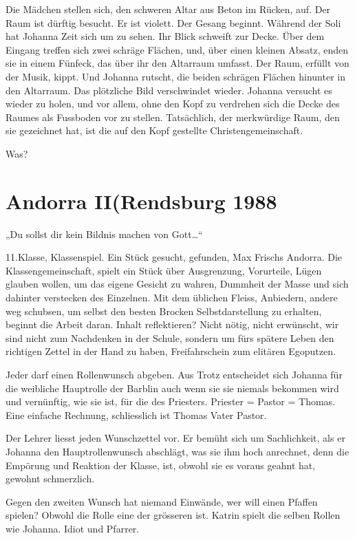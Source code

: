 \documentclass[10pt,a5paper]{book}
\begin{document}
Die Mädchen stellen sich, den schweren Altar aus Beton im Rücken, auf. Der Raum ist dürftig besucht. Er ist violett. Der Gesang beginnt. Während der Soli hat Johanna Zeit sich um zu sehen. Ihr Blick schweift zur Decke. Über dem Eingang treffen sich zwei schräge Flächen, und, über einen kleinen Absatz, enden sie in einem Fünfeck, das über ihr den Altarraum umfasst.
Der Raum, erfüllt von der Musik, kippt. Und Johanna rutscht, die beiden schrägen Flächen hinunter  in den Altarraum. Das plötzliche Bild verschwindet wieder. Johanna versucht es wieder zu holen, und vor allem, ohne den Kopf zu verdrehen sich die Decke des Raumes als Fussboden vor zu stellen. Tatsächlich, der merkwürdige Raum, den sie gezeichnet hat, ist die auf den Kopf gestellte Christengemeinschaft. 

Was?

 
 \section*{Andorra II(Rendsburg 1988}
 

 
„Du sollst dir kein Bildnis machen von Gott\dots “

11.Klasse, Klassenspiel. Ein Stück gesucht, gefunden, Max Frischs Andorra. Die Klassengemeinschaft, spielt ein Stück über Ausgrenzung, Vorurteile, Lügen glauben wollen, um das eigene Gesicht zu wahren, Dummheit der Masse und sich dahinter verstecken des Einzelnen. Mit dem üblichen Fleiss, Anbiedern, andere weg schubsen, um selbst den besten Brocken Selbstdarstellung zu erhalten, beginnt die Arbeit daran. Inhalt reflektieren? Nicht nötig, nicht erwünscht, wir sind nicht zum Nachdenken in der Schule, sondern um fürs spätere Leben den richtigen Zettel in der Hand zu haben, Freifahrschein zum elitären Egoputzen.

Jeder darf einen Rollenwunsch abgeben. Aus Trotz entscheidet sich Johanna für die weibliche Hauptrolle der Barblin auch wenn sie sie niemals bekommen wird und vernünftig, wie sie ist, für die des Priesters. Priester = Pastor = Thomas. Eine einfache Rechnung, schliesslich ist Thomas Vater Pastor.

Der Lehrer liesst jeden Wunschzettel vor. Er bemüht sich um Sachlichkeit, als er Johanna den Hauptrollenwunsch abschlägt, was sie ihm hoch anrechnet, denn die Empörung und Reaktion der Klasse, ist, obwohl sie es voraus geahnt hat, gewohnt schmerzlich.

Gegen den zweiten Wunsch hat niemand Einwände, wer will einen Pfaffen spielen? Obwohl die Rolle eine der grösseren ist. Katrin spielt die selben Rollen wie Johanna. Idiot und Pfarrer.
\end{document}

